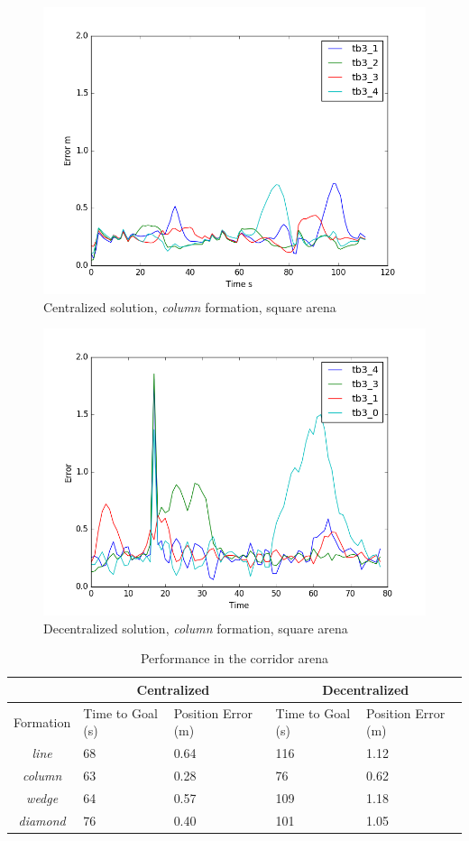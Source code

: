 \documentclass[letterpaper, 10 pt, conference]{ieeeconf}  %
\begin{document}
\begin{figure}[tb]
\centering
\includegraphics[height=0.6\linewidth]{images/centralized_plot.png}
\caption{Centralized solution, \textit{column} formation, square arena}
\label{fig:centralized}
\end{figure}
\begin{figure}[tb]
\centering
\includegraphics[height=0.6\linewidth]{images/decentalized_plot.png}
\caption{Decentralized solution, \textit{column} formation, square arena}
\label{fig:decentralized}
\end{figure}

\begin{table}[tb]
\begin{tabular}{|c|p{1cm}p{1.2cm}|p{1cm}p{1.2cm}|}
\hline
 & \multicolumn{2}{|c|}{Centralized} & \multicolumn{2}{|c|}{Decentralized} \\
\hline
Formation & Time to Goal (s) & Position Error (m) & Time to Goal (s) & Position Error (m) \\
\hline
\textit{line}        & 68                     & 0.64               & 116                   & 1.12 \\
\textit{column}   & 63                     & 0.28               & 76                    & 0.62 \\
\textit{wedge}    & 64                     & 0.57               & 109                  & 1.18 \\
\textit{diamond} & 76                     & 0.40               & 101                   & 1.05 \\
\hline
\end{tabular}
\caption{Performance in the corridor arena}
\label{tab:results_corridor}
\end{table}
\end{document}

